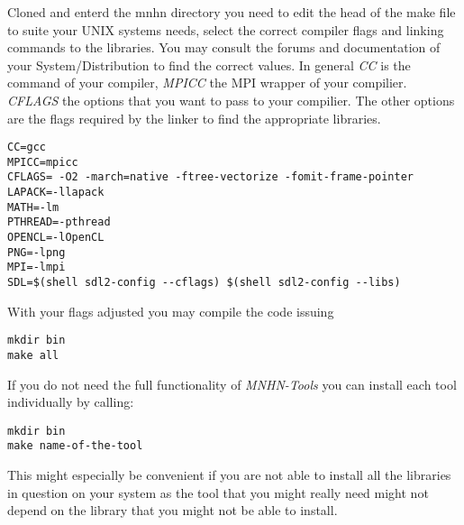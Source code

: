 Cloned and enterd the mnhn directory you need to edit the head of the
make file to suite your UNIX systems needs, select the correct compiler
flags and linking commands to the libraries. You may consult the
forums and documentation of your System/Distribution to find the
correct values. In general \emph{CC} is the command of your compiler,
\emph{MPICC} the MPI wrapper of your compilier. \emph{CFLAGS} the
options that you want to pass to your compilier. The other options are
the flags required by the linker to find the appropriate libraries.
\begin{lstlisting}                                                           
CC=gcc
MPICC=mpicc
CFLAGS= -O2 -march=native -ftree-vectorize -fomit-frame-pointer 
LAPACK=-llapack
MATH=-lm
PTHREAD=-pthread
OPENCL=-lOpenCL
PNG=-lpng
MPI=-lmpi
SDL=$(shell sdl2-config --cflags) $(shell sdl2-config --libs)
\end{lstlisting}
With your flags adjusted you may compile the code issuing
\begin{lstlisting}
mkdir bin
make all
\end{lstlisting}
If you do not need the full functionality of \emph{MNHN-Tools} you can
install each tool individually by calling:
\begin{lstlisting}
mkdir bin
make name-of-the-tool
\end{lstlisting}
This might especially be convenient if you are not able to install all
the libraries in question on your system as the tool that you might
really need might not depend on the library that you might not be able
to install.
